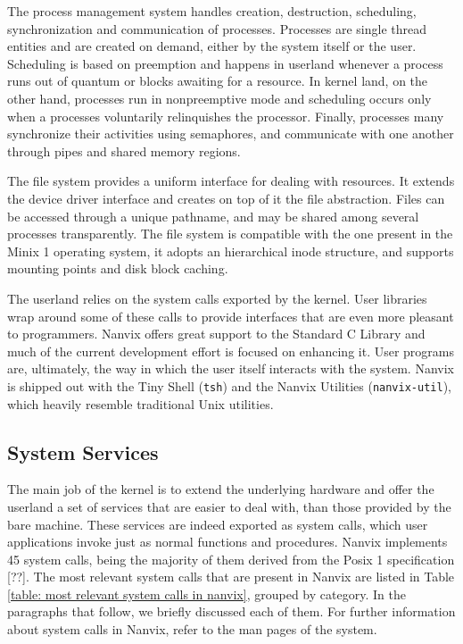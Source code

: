 \documentclass[10pt,a4paper]{article}
\begin{document}
The process management system handles creation, destruction, scheduling, synchronization and communication of processes. Processes are single thread entities and are created on demand, either by the system itself or the user. Scheduling is based on preemption and happens in userland whenever a process runs out of quantum or blocks awaiting for a resource. In kernel land, on the other hand, processes run in nonpreemptive mode and scheduling occurs only when a processes voluntarily relinquishes the processor. Finally, processes many synchronize their activities using semaphores, and communicate with one another through pipes and shared memory regions.

The file system provides a uniform interface for dealing with resources. It extends the device driver interface and creates on top of it the file abstraction. Files can be accessed through a unique pathname, and may be shared among several processes transparently.   The file system is compatible with the one present in the Minix 1 operating system, it adopts an hierarchical inode structure, and supports mounting points and disk block caching.

The userland relies on the system calls exported by the kernel. User libraries wrap around some of these calls to provide interfaces that are even more pleasant to programmers. Nanvix offers great support to the Standard C Library and much of the current development effort is focused on enhancing it. User programs are, ultimately, the way in which the user itself interacts with the system. Nanvix is shipped out with the Tiny Shell (\texttt{tsh}) and the Nanvix Utilities (\texttt{nanvix-util}), which heavily resemble traditional Unix utilities. 

\subsection{System Services}
\label{section: system services}

The main job of the kernel is to extend the underlying hardware and offer the userland a set of services that are easier to deal with, than those provided by the bare machine. These services are indeed exported as system calls, which user applications invoke just as normal functions and procedures. Nanvix implements 45 system calls, being the majority of them derived from the Posix 1 specification [??]. The most relevant system calls that are present in Nanvix are listed in Table \ref{table: most relevant system calls in nanvix}, grouped by category. In the paragraphs that follow, we briefly discussed each of them. For further information about system calls in Nanvix, refer to the man pages of the system.
\end{document}
